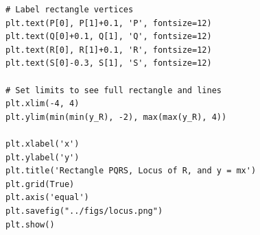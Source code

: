 \documentclass{beamer}
\theoremstyle{remark}
\numberwithin{equation}{section}
\begin{document}
\begin{frame}[fragile]
\begin{lstlisting}
# Label rectangle vertices
plt.text(P[0], P[1]+0.1, 'P', fontsize=12)
plt.text(Q[0]+0.1, Q[1], 'Q', fontsize=12)
plt.text(R[0], R[1]+0.1, 'R', fontsize=12)
plt.text(S[0]-0.3, S[1], 'S', fontsize=12)

# Set limits to see full rectangle and lines
plt.xlim(-4, 4)
plt.ylim(min(min(y_R), -2), max(max(y_R), 4))

plt.xlabel('x')
plt.ylabel('y')
plt.title('Rectangle PQRS, Locus of R, and y = mx')
plt.grid(True)
plt.axis('equal')
plt.savefig("../figs/locus.png")
plt.show()


\end{lstlisting}
\end{frame}
\end{document}

